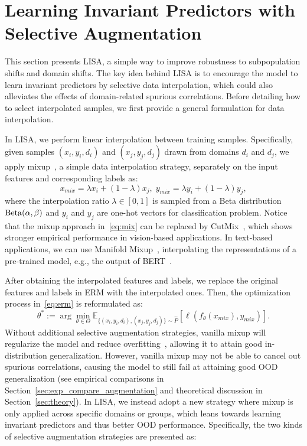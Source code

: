 \section{Learning Invariant Predictors with Selective Augmentation}
\label{sec:method}
This section presents LISA, a simple way to improve robustness to subpopulation shifts and domain shifts. The key idea behind LISA is to encourage the model to learn invariant predictors by selective data interpolation, which could also alleviates the effects of domain-related spurious correlations. Before detailing how to select interpolated samples, we first provide a general formulation for data interpolation.

In LISA, we perform linear interpolation between training samples. Specifically, given samples $(x_i, y_i, d_i)$ and $(x_j, y_j, d_j)$ drawn from domains $d_i$ and $d_j$, we apply mixup~\citep{zhang2017mixup}, a simple data interpolation strategy, separately on the input features and corresponding labels as:
\begin{equation}
\label{eq:mix}
    x_{mix}=\lambda x_i + (1-\lambda) x_j,\; y_{mix} = \lambda y_i + (1-\lambda) y_j,
\end{equation}
where the interpolation ratio $\lambda \in [0,1]$ is sampled from a Beta distribution $\rm{Beta}(\alpha, \beta)$ and $y_i$ and $y_j$ are one-hot vectors for classification problem. Notice that the mixup approach in~\eqref{eq:mix} can be replaced by CutMix~\citep{yun2019cutmix}, which shows stronger empirical performance in vision-based applications. In text-based applications, we can use Manifold Mixup~\citep{verma2019manifold}, interpolating the representations of a pre-trained model, e.g., the output of BERT~\citep{devlin2018bert}.

After obtaining the interpolated features and labels, we replace the original features and labels in ERM with the interpolated ones. Then, the optimization process in~\eqref{eq:erm} is reformulated as:
\begin{equation}
\label{eq:erm_mix}
\theta^{*} := \arg\min_{\theta \in \Theta} \mathbb{E}_{\{(x_i,y_i,d_i), (x_j, y_j,d_j)\}\sim \hat{P}} [\ell(f_{\theta}(x_{mix}), y_{mix})].
\end{equation}
Without additional selective augmentation strategies, vanilla mixup will regularize the model and reduce overfitting~\citep{zhang2020does}, allowing it to attain good in-distribution generalization. However, vanilla mixup may not be able to cancel out spurious correlations, causing the model to still fail at attaining good OOD generalization (see empirical comparisons in Section~\ref{sec:exp_compare_augmentation} and theoretical discussion in Section~\ref{sec:theory}). In LISA, we instead adopt a new strategy where mixup is only applied across specific domains or groups, which leans towards learning invariant 
predictors and thus better OOD performance. Specifically, the two kinds of selective augmentation strategies are presented as:

